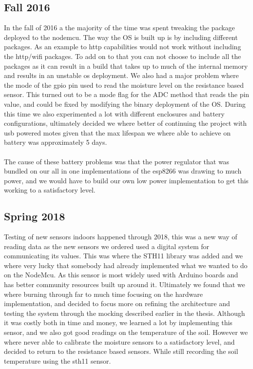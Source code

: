 \documentclass[]{uiophd}
\begin{document}
\subsection{Fall 2016}
In the fall of 2016 a the majority of the time was spent tweaking the package deployed to the nodemcu. The way the OS is built up is by including different packages. As an example to http capabilities would not work without including the http/wifi packages. To add on to that you can not choose to include all the packages as it can result in a build that takes up to much of the internal memory and results in an unstable os deployment. We also had a major problem where the mode of the gpio pin used to read the moisture level on the resistance based sensor. This turned out to be a mode flag for the ADC method that reads the pin value, and could be fixed by modifying the binary deployment of the OS. During this time we also experimented a lot with different enclosures and battery configurations, ultimately decided we where better of continuing the project with usb powered motes given that the max lifespan we where able to achieve on battery was approximately 5 days.
\\\\
The cause of these battery problems was that the power regulator that was bundled on our all in one implementations of the esp8266 was drawing to much power, and we would have to build our own low power implementation to get this working to a satisfactory level.
\subsection{Spring 2018}
Testing of new sensors indoors happened through 2018, this was a new way of reading data as the new sensors we ordered used a digital system for communicating its values. This was where the STH11 library was added and we where very lucky that somebody had already implemented what we wanted to do on the NodeMcu. As this sensor is most widely used with Arduino boards and has better community resources built up around it. Ultimately we found that we where burning through far to much time focusing on the hardware implementation, and decided to focus more on refining the architecture and testing the system through the mocking described earlier in the thesis. Although it was costly both in time and money, we learned a lot by implementing this sensor, and we also got good readings on the temperature of the soil. However we where never able to calibrate the moisture sensors to a satisfactory level, and decided to return to the resistance based sensors. While still recording the soil temperature using the sth11 sensor. 
\end{document}
